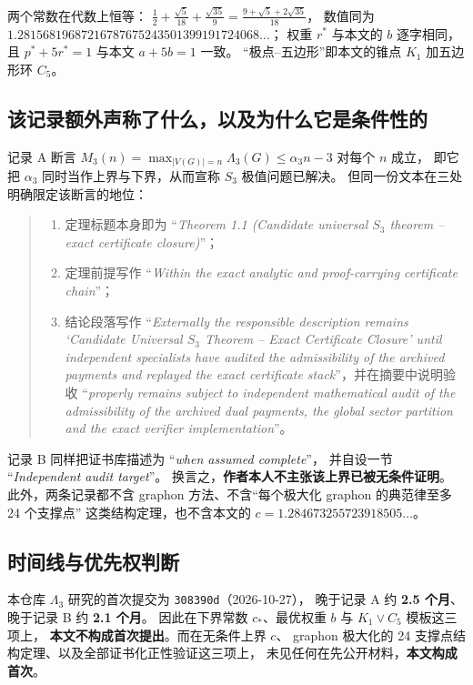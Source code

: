 \documentclass[UTF8,11pt]{ctexart}
\newcommand{\Lam}{\Lambda}
\newcommand{\cst}{c_\ast}
\begin{document}
两个常数在代数上恒等：
$\frac12+\frac{\sqrt5}{18}+\frac{\sqrt{35}}9
 =\frac{9+\sqrt5+2\sqrt{35}}{18}$，
数值同为 $1.28156819687216787675243501399191724068\ldots$；
权重 $r^\ast$ 与本文的 $b$ 逐字相同，且 $p^\ast+5r^\ast=1$ 与本文 $a+5b=1$ 一致。
``极点--五边形''即本文的锥点 $K_1$ 加五边形环 $C_5$。

\subsection{该记录额外声称了什么，以及为什么它是条件性的}

记录 A 断言 $M_3(n)=\max_{|V(G)|=n}\Lam_3(G)\le\alpha_3n-3$ 对每个 $n$ 成立，
即它把 $\alpha_3$ 同时当作上界与下界，从而宣称 $S_3$ 极值问题已解决。
但同一份文本在三处明确限定该断言的地位：

\begin{quote}\small
\begin{enumerate}[label=(\alph*),leftmargin=1.8em]
\item 定理标题本身即为
``\emph{Theorem 1.1 (Candidate universal $S_3$ theorem -- exact certificate closure)}''；
\item 定理前提写作 ``\emph{Within the exact analytic and proof-carrying certificate chain}''；
\item 结论段落写作 ``\emph{Externally the responsible description remains
`Candidate Universal $S_3$ Theorem -- Exact Certificate Closure' until independent
specialists have audited the admissibility of the archived payments and replayed the
exact certificate stack}''，并在摘要中说明验收
``\emph{properly remains subject to independent mathematical audit of the admissibility
of the archived dual payments, the global sector partition and the exact verifier
implementation}''。
\end{enumerate}
\end{quote}

记录 B 同样把证书库描述为 ``\emph{when assumed complete}''，
并自设一节 ``\emph{Independent audit target}''。
换言之，\textbf{作者本人不主张该上界已被无条件证明}。
此外，两条记录都不含 graphon 方法、不含``每个极大化 graphon 的典范律至多 24 个支撑点''
这类结构定理，也不含本文的 $c=1.284673255723918505\ldots$。

\subsection{时间线与优先权判断}

本仓库 $\Lam_3$ 研究的首次提交为 \texttt{308390d}（2026-10-27），
晚于记录 A 约 \textbf{2.5 个月}、晚于记录 B 约 \textbf{2.1 个月}。
因此在下界常数 $\cst$、最优权重 $b$ 与 $K_1\vee C_5$ 模板这三项上，
\textbf{本文不构成首次提出}。而在无条件上界 $c$、
graphon 极大化的 24 支撑点结构定理、以及全部证书化正性验证这三项上，
未见任何在先公开材料，\textbf{本文构成首次}。
\end{document}
